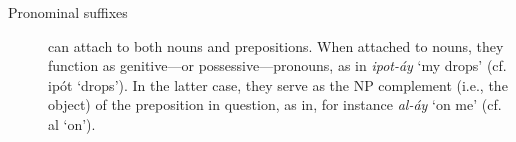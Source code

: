 {\begin{description}
\item[Pronominal suffixes] can attach to both nouns and prepositions. When attached to nouns, they function as genitive---or possessive---pronouns, as in \textit{ipot-\'{a}y} `my drops' (cf. ip\'{o}t `drops').
In the latter case, they serve as the NP complement (i.e., the object) of the preposition 
in question, as in, for instance \textit{al-\'{a}y} `on me' (cf. al `on').
\begin{table}[ht]
\centering
{}
\caption{Pronominal suffixes}
\label{tab:pro-suffixes}
\end{table}


\end{description}}
